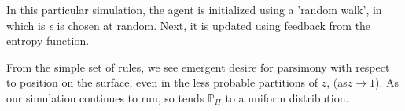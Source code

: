 \documentclass[english]{article}
\begin{document}
In this particular simulation, the agent is initialized using a 'random
walk', in which is $\epsilon$ is chosen at random. Next, it is updated
using feedback from the entropy function.

From the simple set of rules, we see emergent desire for parsimony
with respect to position on the surface, even in the less probable
partitions of $z$, (as$z\rightarrow1$). As our simulation continues
to run, so tends $\mathbb{P}_{H}$ to a uniform distribution.

\begin{figure}
\hfill{}


\end{figure}
\end{document}
